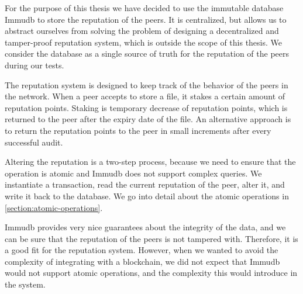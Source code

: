 For the purpose of this thesis we have decided to use the immutable database Immudb \cite{immudb}
to store the reputation of the peers.
It is centralized, but allows us to abstract ourselves from solving the problem of designing a
decentralized and tamper-proof reputation system, which is outside the scope of this thesis.
We consider the database as a single source of truth for the reputation of the peers during our tests.

The reputation system is designed to keep track of the behavior of the peers in the network.
When a peer accepts to store a file, it stakes a certain amount of reputation points.
Staking is temporary decrease of reputation points,
which is returned to the peer after the expiry date of the file.
An alternative approach is to return the reputation points to the peer in small increments
after every successful audit.

Altering the reputation is a two-step process, because we need to ensure that the operation is atomic
and Immudb does not support complex queries.
We instantiate a transaction, read the current reputation of the peer, alter it, and write it back to the database.
We go into detail about the atomic operations in \autoref{section:atomic-operations}.

Immudb provides very nice guarantees about the integrity of the data,
and we can be sure that the reputation of the peers is not tampered with.
Therefore, it is a good fit for the reputation system.
However, when we wanted to avoid the complexity of integrating with a blockchain,
we did not expect that Immudb would not support atomic operations,
and the complexity this would introduce in the system.
